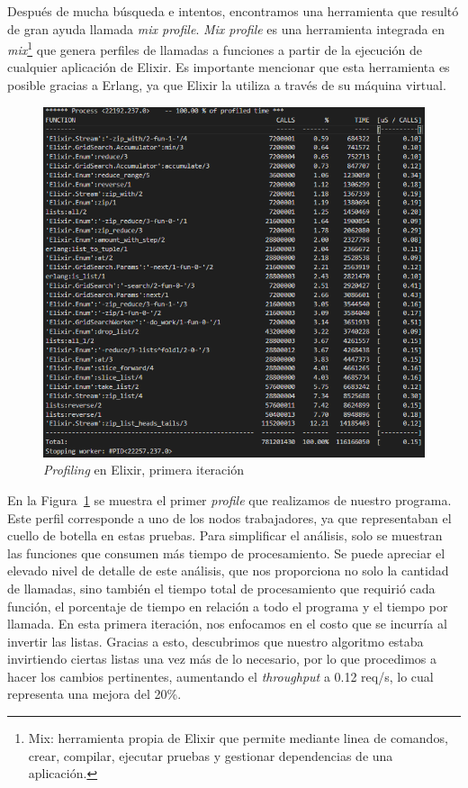 \documentclass[11pt]{article}
\newcommand{\english}[1]{\textit{#1}}
\begin{document}
Después de mucha búsqueda e intentos, encontramos una herramienta que resultó de gran ayuda llamada \textit{mix profile}. \textit{Mix profile} es una herramienta integrada en \textit{mix}\footnote{Mix: herramienta propia de Elixir que permite mediante linea de comandos, crear, compilar, ejecutar pruebas y gestionar dependencias de una aplicación.} que genera perfiles de llamadas a funciones a partir de la ejecución de cualquier aplicación de Elixir. Es importante mencionar que esta herramienta es posible gracias a Erlang, ya que Elixir la utiliza a través de su máquina virtual.

\begin{figure}[ht]
    \centering
    \includegraphics[scale=0.4]{resources/distributed_systems/elixir/1.png}
    \caption{\english{Profiling} en Elixir, primera iteración}
    \label{fig:elx:profiling_1}
\end{figure}

En la Figura~\ref{fig:elx:profiling_1} se muestra el primer \english{profile} que realizamos de nuestro programa. Este perfil corresponde a uno de los nodos trabajadores, ya que representaban el cuello de botella en estas pruebas. Para simplificar el análisis, solo se muestran las funciones que consumen más tiempo de procesamiento. Se puede apreciar el elevado nivel de detalle de este análisis, que nos proporciona no solo la cantidad de llamadas, sino también el tiempo total de procesamiento que requirió cada función, el porcentaje de tiempo en relación a todo el programa y el tiempo por llamada. En esta primera iteración, nos enfocamos en el costo que se incurría al invertir las listas. Gracias a esto, descubrimos que nuestro algoritmo estaba invirtiendo ciertas listas una vez más de lo necesario, por lo que procedimos a hacer los cambios pertinentes, aumentando el \english{throughput} a 0.12 req/s, lo cual representa una mejora del 20\%.
\end{document}
